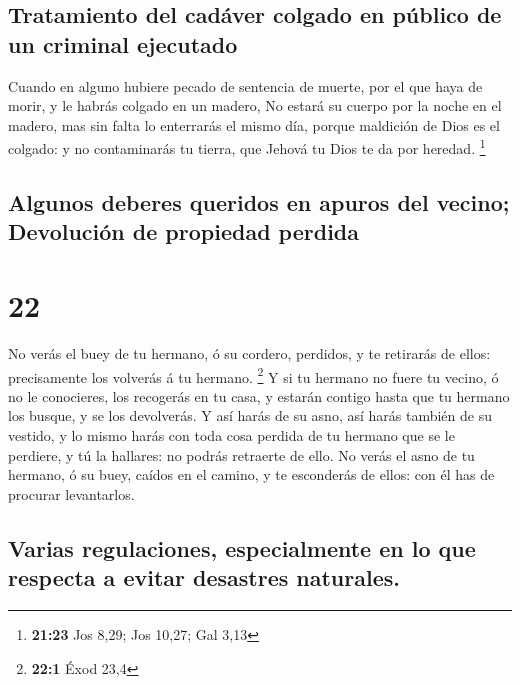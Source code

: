 \hypertarget{tratamiento-del-caduxe1ver-colgado-en-puxfablico-de-un-criminal-ejecutado}{%
\subsection{Tratamiento del cadáver colgado en público de un criminal
ejecutado}\label{tratamiento-del-caduxe1ver-colgado-en-puxfablico-de-un-criminal-ejecutado}}

 Cuando en alguno hubiere pecado de sentencia de muerte,
por el que haya de morir, y le habrás colgado en un madero,
 No estará su cuerpo por la noche en el madero, mas sin
falta lo enterrarás el mismo día, porque maldición de Dios es el
colgado: y no contaminarás tu tierra, que Jehová tu Dios te da por
heredad. \footnote{\textbf{21:23} Jos 8,29; Jos 10,27; Gal 3,13}

\hypertarget{algunos-deberes-queridos-en-apuros-del-vecino-devoluciuxf3n-de-propiedad-perdida}{%
\subsection{Algunos deberes queridos en apuros del vecino; Devolución de
propiedad
perdida}\label{algunos-deberes-queridos-en-apuros-del-vecino-devoluciuxf3n-de-propiedad-perdida}}

\hypertarget{section-21}{%
\section{22}\label{section-21}}

 No verás el buey de tu hermano, ó su cordero, perdidos, y
te retirarás de ellos: precisamente los volverás á tu hermano.
\footnote{\textbf{22:1} Éxod 23,4}  Y si tu hermano no fuere
tu vecino, ó no le conocieres, los recogerás en tu casa, y estarán
contigo hasta que tu hermano los busque, y se los devolverás.
 Y así harás de su asno, así harás también de su vestido, y
lo mismo harás con toda cosa perdida de tu hermano que se le perdiere, y
tú la hallares: no podrás retraerte de ello.  No verás el
asno de tu hermano, ó su buey, caídos en el camino, y te esconderás de
ellos: con él has de procurar levantarlos.

\hypertarget{varias-regulaciones-especialmente-en-lo-que-respecta-a-evitar-desastres-naturales.}{%
\subsection{Varias regulaciones, especialmente en lo que respecta a
evitar desastres
naturales.}\label{varias-regulaciones-especialmente-en-lo-que-respecta-a-evitar-desastres-naturales.}}

